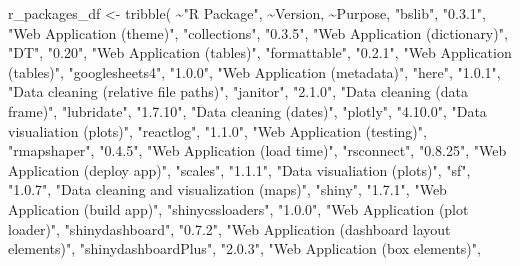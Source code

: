 \documentclass[
  11 pt,
  openany]{book}
\newenvironment{Shaded}{\begin{snugshade}}{\end{snugshade}}
\newcommand{\FunctionTok}[1]{\textcolor[rgb]{0.00,0.00,0.00}{#1}}
\newcommand{\NormalTok}[1]{#1}
\newcommand{\OtherTok}[1]{\textcolor[rgb]{0.56,0.35,0.01}{#1}}
\newcommand{\SpecialCharTok}[1]{\textcolor[rgb]{0.00,0.00,0.00}{#1}}
\newcommand{\StringTok}[1]{\textcolor[rgb]{0.31,0.60,0.02}{#1}}
\begin{document}
\begin{Shaded}
\begin{Highlighting}[]
\NormalTok{r\_packages\_df }\OtherTok{\textless{}{-}} 
  \FunctionTok{tribble}\NormalTok{(}
    \SpecialCharTok{\textasciitilde{}}\StringTok{"R Package"}\NormalTok{, }\SpecialCharTok{\textasciitilde{}}\NormalTok{Version, }\SpecialCharTok{\textasciitilde{}}\NormalTok{Purpose,}
    \StringTok{"bslib"}\NormalTok{, }\StringTok{"0.3.1"}\NormalTok{, }\StringTok{"Web Application (theme)"}\NormalTok{,}
    \StringTok{"collections"}\NormalTok{, }\StringTok{"0.3.5"}\NormalTok{, }\StringTok{"Web Application (dictionary)"}\NormalTok{,}
    \StringTok{"DT"}\NormalTok{, }\StringTok{"0.20"}\NormalTok{, }\StringTok{"Web Application (tables)"}\NormalTok{,}
    \StringTok{"formattable"}\NormalTok{, }\StringTok{"0.2.1"}\NormalTok{, }\StringTok{"Web Application (tables)"}\NormalTok{,}
    \StringTok{"googlesheets4"}\NormalTok{, }\StringTok{"1.0.0"}\NormalTok{, }\StringTok{"Web Application (metadata)"}\NormalTok{,}
    \StringTok{"here"}\NormalTok{, }\StringTok{"1.0.1"}\NormalTok{, }\StringTok{"Data cleaning (relative file paths)"}\NormalTok{,}
    \StringTok{"janitor"}\NormalTok{, }\StringTok{"2.1.0"}\NormalTok{, }\StringTok{"Data cleaning (data frame)"}\NormalTok{,}
    \StringTok{"lubridate"}\NormalTok{, }\StringTok{"1.7.10"}\NormalTok{, }\StringTok{"Data cleaning (dates)"}\NormalTok{,}
    \StringTok{"plotly"}\NormalTok{, }\StringTok{"4.10.0"}\NormalTok{, }\StringTok{"Data visualiation (plots)"}\NormalTok{,}
    \StringTok{"reactlog"}\NormalTok{, }\StringTok{"1.1.0"}\NormalTok{, }\StringTok{"Web Application (testing)"}\NormalTok{,}
    \StringTok{"rmapshaper"}\NormalTok{, }\StringTok{"0.4.5"}\NormalTok{, }\StringTok{"Web Application (load time)"}\NormalTok{,}
    \StringTok{"rsconnect"}\NormalTok{, }\StringTok{"0.8.25"}\NormalTok{, }\StringTok{"Web Application (deploy app)"}\NormalTok{,}
    \StringTok{"scales"}\NormalTok{, }\StringTok{"1.1.1"}\NormalTok{, }\StringTok{"Data visualiation (plots)"}\NormalTok{,}
    \StringTok{"sf"}\NormalTok{, }\StringTok{"1.0.7"}\NormalTok{, }\StringTok{"Data cleaning and visualization (maps)"}\NormalTok{,}
    \StringTok{"shiny"}\NormalTok{, }\StringTok{"1.7.1"}\NormalTok{, }\StringTok{"Web Application (build app)"}\NormalTok{,}
    \StringTok{"shinycssloaders"}\NormalTok{, }\StringTok{"1.0.0"}\NormalTok{, }\StringTok{"Web Application (plot loader)"}\NormalTok{,}
    \StringTok{"shinydashboard"}\NormalTok{, }\StringTok{"0.7.2"}\NormalTok{, }\StringTok{"Web Application (dashboard layout elements)"}\NormalTok{,}
    \StringTok{"shinydashboardPlus"}\NormalTok{, }\StringTok{"2.0.3"}\NormalTok{, }\StringTok{"Web Application (box elements)"}\NormalTok{,}

\end{Highlighting}
\end{Shaded}
\end{document}
